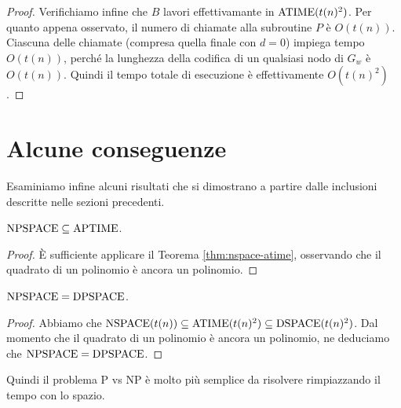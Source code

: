 \begin{proof}
  Verifichiamo infine che $B$ lavori effettivamante in $\operatorname{ATIME}(t(n)^2)$.
  Per quanto appena osservato, il numero di chiamate alla subroutine $P$ è $O(t(n))$.
  Ciascuna delle chiamate (compresa quella finale con $d=0$) impiega tempo $O(t(n))$, perché la lunghezza della codifica di un qualsiasi nodo di $G_w$ è $O(t(n))$.
  Quindi il tempo totale di esecuzione è effettivamente $O(t(n)^2)$.
\end{proof}


\section{Alcune conseguenze}

Esaminiamo infine alcuni risultati che si dimostrano a partire dalle inclusioni descritte nelle sezioni precedenti.

\begin{corollario}
  $\operatorname{NPSPACE} \subseteq \operatorname{APTIME}$.
\end{corollario}

\begin{proof}
  È sufficiente applicare il Teorema \ref{thm:nspace-atime}, osservando che il quadrato di un polinomio è ancora un polinomio.
\end{proof}


\begin{corollario}
  \label{cor:npspace-dpspace}
  $\operatorname{NPSPACE} = \operatorname{DPSPACE}$.
\end{corollario}

\begin{proof}
  Abbiamo che $\operatorname{NSPACE}(t(n))\subseteq \operatorname{ATIME}(t(n)^2) \subseteq \operatorname{DSPACE}(t(n)^2)$.
  Dal momento che il quadrato di un polinomio è ancora un polinomio, ne deduciamo che $\operatorname{NPSPACE} = \operatorname{DPSPACE}$.
\end{proof}

Quindi il problema P vs NP è molto più semplice da risolvere rimpiazzando il tempo con lo spazio.


